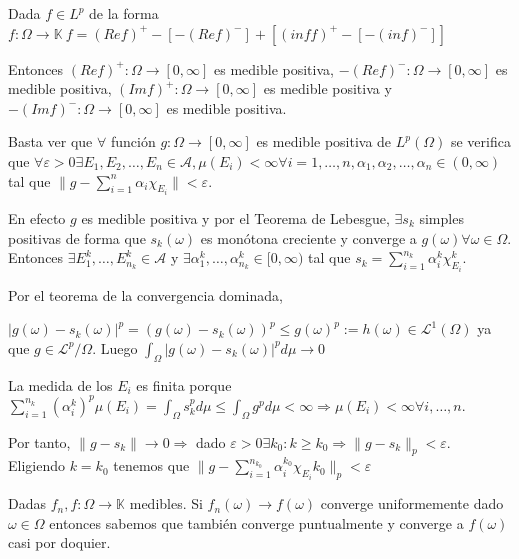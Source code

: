 \documentclass[11pt, a4paper]{article}
\makeatletter
\newif\IfInSansMode
\let\oldsf\sffamily
\renewcommand*{\sffamily}{\oldsf\mathversion{sans}\InSansModetrue}
\let\oldnorm\normalfont
\renewcommand*{\normalfont}{\oldnorm\InSansModefalse\mathversion{normal}}
\renewenvironment{proof}[1][\proofname] {\par\pushQED{\qed}\normalfont\topsep6\p@\@plus6\p@\relax\trivlist\item[\hskip\labelsep\itshape\sffamily#1\@addpunct{.}]\ignorespaces}{\popQED\endtrivlist\@endpefalse}
\theoremstyle{theorem-style}
\theoremstyle{definition-style}
\theoremstyle{remark-style}
\theoremstyle{example-style}
\makeatother
\begin{document}
\begin{proof}
  Dada $f \in L^{p}$ de la forma $f: \Omega \rightarrow \mathbb K \ f =
  (Ref)^{+} - [-(Ref)^{-}] + [(inf f)^{+}- [-(inf)^{-}]]$

  Entonces $(Ref)^{+}: \Omega \rightarrow [0, \infty]$ es medible positiva,
  $-(Ref)^{-}: \Omega \rightarrow [0, \infty]$ es medible positiva, $(Imf)^{+}:
  \Omega \rightarrow [0, \infty]$ es medible positiva y $-(Imf)^{-}: \Omega
  \rightarrow [0, \infty]$ es medible positiva.

  Basta ver que $\forall$ función $g: \Omega \rightarrow [0, \infty]$ es medible
  positiva de $L^{p}(\Omega)$ se verifica que $\forall \varepsilon > 0 \exists
  E_{1}, E_{2}, \hdots,E_{n} \in \mathscr A, \mu(E_{i}) < \infty \forall i = 1,
  \hdots, n, \alpha_{1}, \alpha_{2}, \hdots, \alpha_{n} \in (0, \infty)$ tal que
  $\|g - \sum_{i=1}^{n} \alpha_{i}\chi_{E_{i}}\| < \varepsilon$.

  En efecto $g$ es medible positiva y por el Teorema de Lebesgue, $\exists
  {s_{k}}$ simples positivas de forma que $s_{k}(\omega)$ es monótona creciente
  y converge a $g(\omega) \forall \omega \in \Omega$. Entonces $\exists
  E_{1}^{k}, \hdots, E_{n_{k}}^{k} \in \mathscr A$ y $\exists \alpha_{1}^{k},
  \hdots, \alpha_{n_{k}}^{k} \in [0, \infty)$ tal que $s_{k} =
  \sum_{i=1}^{n_{k}}\alpha_{i}^{k}\chi_{E_{i}}^{k}$.

  Por el teorema de la convergencia dominada,

  $|g(\omega) - s_{k}(\omega)|^{p} = (g(\omega) - s_{k}(\omega))^{p} \leq
  g(\omega)^{p}:= h(\omega) \in \mathcal L^{1}(\Omega)$ ya que $g \in \mathcal
  L^{p}/\Omega$. Luego $\int_{\Omega}|g(\omega) - s_{k}(\omega)|^{p}d\mu
  \rightarrow 0$

  La medida de los $E_{i}$ es finita porque
  $\sum_{i=1}^{n_{k}}(\alpha_{i}^{k})^{p}\mu(E_{i}) = \int_{\Omega}s_{k}^{p}d\mu
  \leq \int_{\Omega}g^{p}d\mu < \infty \Rightarrow \mu(E_{i}) < \infty \forall
  i, \hdots, n$.

  Por tanto, $\|g-s_{k}\| \rightarrow 0 \Rightarrow$ dado $\varepsilon > 0
  \exists k_{0} : k  \geq k_{0} \Rightarrow \|g-s_{k}\|_{p} <
  \varepsilon$. Eligiendo $k = k_{0}$ tenemos que $\|g -
  \sum_{i=1}^{n_{k_{0}}}\alpha_{i}^{k_{0}}\chi_{E_{i}}k_{0}\|_{p} < \varepsilon$
\end{proof}

Dadas $f_{n}, f : \Omega \rightarrow \mathbb K$ medibles. Si ${f_{n}(\omega)}
\rightarrow f(\omega)$ converge uniformemente dado $\omega \in \Omega$ entonces
sabemos que también converge puntualmente y converge a $f(\omega)$ casi por
doquier.
\end{document}
